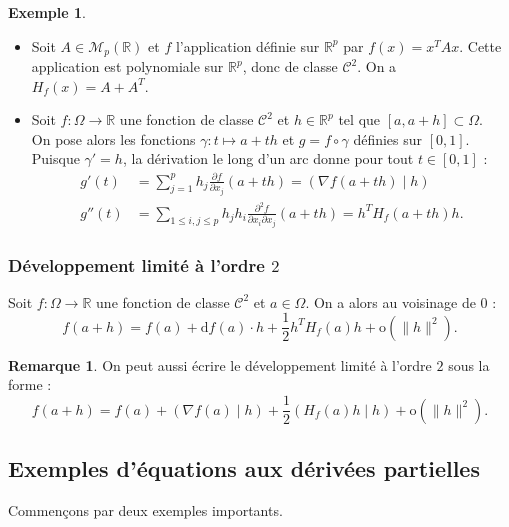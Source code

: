 \documentclass[french]{article}
\newcommand{\R}{\mathbb{R}}
\renewcommand{\o}{\text{o}}
\renewcommand{\d}{\text{d}}
\theoremstyle{plain}
\theoremstyle{definition}
\newtheorem*{ex}{Exemple}
\newtheorem*{rmq}{Remarque}
\theoremstyle{remark}
\begin{document}
\begin{ex}
	\begin{itemize}
		\item Soit $A\in\mathcal{M}_p(\R)$ et $f$ l'application définie sur $\R^p$ par $f(x)=x^TAx$. Cette application est polynomiale sur $\R^p$, donc de classe $\mathcal{C}^2$. On a $H_f(x)=A+A^T$.
		\item Soit $f:\Omega\to\R$ une fonction de classe $\mathcal{C}^2$ et $h\in\R^p$ tel que $[a,a+h]\subset\Omega$. \\
		On pose alors les fonctions $\gamma:t\mapsto a+th$ et $g=f\circ\gamma$ définies sur $[0,1]$. Puisque $\gamma'=h$, la dérivation le long d'un arc donne pour tout $t\in[0,1]$ :
		\begin{align*}
			g'(t)&=\sum_{j=1}^{p}h_j\frac{\partial f}{\partial x_j}(a+th)=(\nabla f(a+th)\mid h)\\[2mm]
			g''(t)&=\sum_{1\leqslant i,j\leqslant p}h_jh_i\frac{\partial^2 f}{\partial x_i\partial x_j}(a+th)=h^T H_f(a+th)h.
		\end{align*}
	\end{itemize}
\end{ex}

\subsubsection*{Développement limité à l'ordre $2$}

\begin{thm}%
	Soit $f:\Omega\to\R$ une fonction de classe $\mathcal{C}^2$ et $a\in\Omega$. On a alors au voisinage de $0$ :
	$$f(a+h)=f(a)+\d f(a)\cdot h+\frac{1}{2}h^T H_f(a)h+\o(\lVert h\rVert^2).$$
\end{thm}

\begin{rmq}
	On peut aussi écrire le développement limité à l'ordre $2$ sous la forme :
	$$f(a+h)=f(a)+(\nabla f(a)\mid h)+\frac{1}{2}(H_f(a)h\mid h)+\o(\lVert h\rVert^2).$$
\end{rmq}

\subsection{Exemples d'équations aux dérivées partielles}

Commençons par deux exemples importants.
\end{document}
